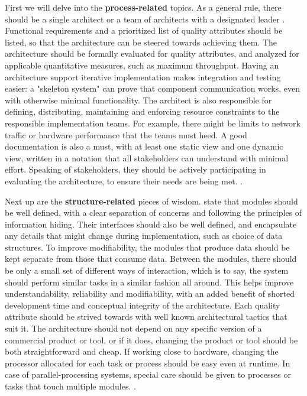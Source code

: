 \documentclass[utf8,english]{gradu3}
\begin{document}
First we will delve into the \textbf{process-related} topics. As a general rule, there
should be a single architect or a team of architects with a designated leader
\parencite[15]{Bass1998}. Functional requirements and a prioritized list of quality
attributes should be listed, so that the architecture can be steered towards
achieving them. The architecture should be formally evaluated for quality
attributes, and analyzed for applicable quantitative measures, such as maximum
throughput. Having an architecture support iterative implementation makes
integration and testing easier: a "skeleton system" can prove that component
communication works, even with otherwise minimal functionality. The architect is
also responsible for defining, distributing, maintaining and enforcing resource
constraints to the responsible implementation teams. For example, there might be
limits to network traffic or hardware performance that the teams must heed. A
good documentation is also a must, with at least one static view and one dynamic
view, written in a notation that all stakeholders can understand with minimal
effort. Speaking of stakeholders, they should be actively participating in
evaluating the architecture, to ensure their needs are being met. \parencite[15]{Bass1998}.

Next up are the \textbf{structure-related} pieces of wisdom. \textcite[16]{Bass1998} state that
modules should be well defined, with a clear separation of concerns and
following the principles of information hiding. Their interfaces should also be
well defined, and encapsulate any details that might change during
implementation, such as choice of data structures. To improve modifiability, the
modules that produce data should be kept separate from those that consume data.
Between the modules, there should be only a small set of different ways of
interaction, which is to say, the system should perform similar tasks in a
similar fashion all around. This helps improve understandability, reliability
and modifiability, with an added benefit of shorted development time and
conceptual integrity of the architecture. Each quality attribute should be
strived towards with well known architectural tactics that suit it. The
architecture should not depend on any specific version of a commercial product
or tool, or if it does, changing the product or tool should be both
straightforward and cheap. If working close to hardware, changing the processor
allocated for each task or process should be easy even at runtime. In case of
parallel-processing systems, special care should be given to processes or tasks
that touch multiple modules. \parencite[16]{Bass1998}.
\end{document}

